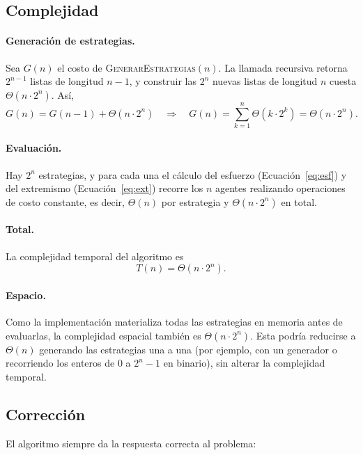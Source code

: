 \documentclass[11pt,letterpaper]{article}
\begin{document}
\subsection{Complejidad}

\paragraph{Generación de estrategias.} Sea $G(n)$ el costo de
\textsc{GenerarEstrategias}$(n)$. La llamada recursiva retorna $2^{n-1}$
listas de longitud $n-1$, y construir las $2^n$ nuevas listas de longitud $n$
cuesta $\Theta(n \cdot 2^n)$. Así,
\[
  G(n) = G(n-1) + \Theta(n \cdot 2^n)
  \quad\Longrightarrow\quad
  G(n) = \sum_{k=1}^{n} \Theta(k \cdot 2^k) = \Theta(n \cdot 2^n).
\]

\paragraph{Evaluación.} Hay $2^n$ estrategias, y para cada una el cálculo del
esfuerzo (Ecuación~\ref{eq:esf}) y del extremismo (Ecuación~\ref{eq:ext})
recorre los $n$ agentes realizando operaciones de costo constante, es decir,
$\Theta(n)$ por estrategia y $\Theta(n \cdot 2^n)$ en total.

\paragraph{Total.} La complejidad temporal del algoritmo es
\[
  T(n) = \Theta(n \cdot 2^n).
\]

\paragraph{Espacio.} Como la implementación materializa todas las estrategias
en memoria antes de evaluarlas, la complejidad espacial también es
$\Theta(n \cdot 2^n)$. Esta podría reducirse a $\Theta(n)$ generando las
estrategias una a una (por ejemplo, con un generador o recorriendo los
enteros de $0$ a $2^n - 1$ en binario), sin alterar la complejidad temporal.

\subsection{Corrección}

El algoritmo siempre da la respuesta correcta al problema:
\end{document}
